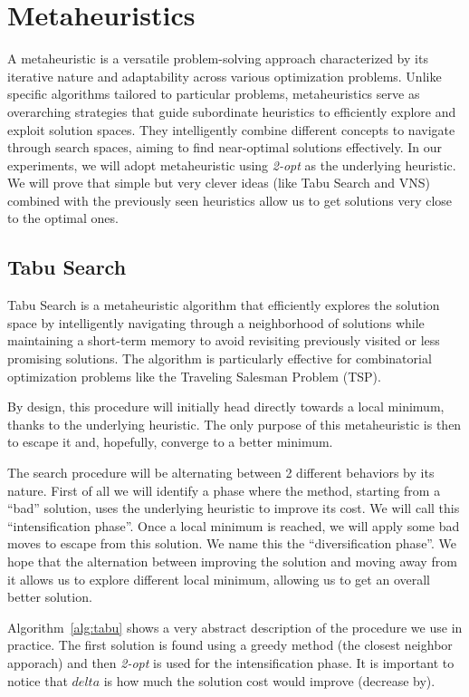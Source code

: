 \documentclass{article}
\begin{document}
\section{Metaheuristics}
A metaheuristic is a versatile problem-solving approach characterized by its iterative nature and adaptability across various optimization problems. Unlike specific algorithms tailored to particular problems, metaheuristics serve as overarching strategies that guide subordinate heuristics to efficiently explore and exploit solution spaces. They intelligently combine different concepts to navigate through search spaces, aiming to find near-optimal solutions effectively.
In our experiments, we will adopt metaheuristic using \textit{2-opt} as the underlying
heuristic. We will prove that simple but very clever ideas (like Tabu Search and VNS) combined with the previously seen heuristics allow us to get solutions very close to the optimal ones.

\subsection{Tabu Search}
Tabu Search is a metaheuristic algorithm that efficiently explores the solution space by intelligently navigating through a neighborhood of solutions while maintaining a short-term memory to avoid revisiting previously visited or less promising solutions. The algorithm is particularly effective for combinatorial optimization problems like the Traveling Salesman Problem (TSP).

By design, this procedure will initially head directly towards a local minimum, thanks to the underlying heuristic. The only purpose of this metaheuristic is then to escape it and, hopefully, converge to a better minimum.

The search procedure will be alternating between 2 different behaviors by its nature. First of all
we will identify a phase where the method, starting from a ``bad'' solution, uses the underlying
heuristic to improve its cost. We will call this ``intensification phase''. Once a local minimum is reached, we will apply some bad moves to escape from this solution. We name this the ``diversification phase''. We hope that the alternation between improving the solution and moving
away from it allows us to explore different local minimum, allowing us to get an overall better
solution.

Algorithm~\ref{alg:tabu} shows a very abstract description of the procedure we use in practice. The first solution is found using a greedy method (the closest neighbor apporach) and then \textit{2-opt} is used for the intensification phase. It is important to notice that $delta$ is
how much the solution cost would improve (decrease by).
\end{document}
